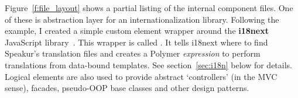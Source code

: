 Figure~\ref{f:file_layout} shows a partial listing of the internal component files.
One of these is abstraction layer for an internationalization library.
Following the  example, 
I created a simple custom element wrapper around the \textbf{i18next} 
JavaScript library~\cite{i18nextcontributors2015}.
This wrapper is called . 
It tells i18next where to find Speakur's translation files and creates a Polymer \textit{expression} to perform translations from data-bound templates. 
See section~\ref{sec:i18n} below for details.
Logical elements are also used to provide abstract `controllers' 
(in the MVC sense), 
facades, pseudo-OOP base classes and other design patterns.

